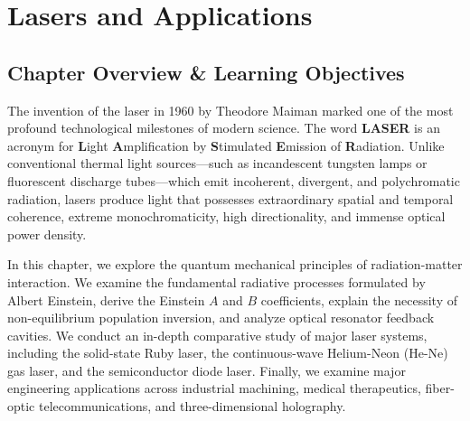 \chapter{Lasers and Applications}
\label{chap:lasers}

\section{Chapter Overview \& Learning Objectives}
The invention of the laser in 1960 by Theodore Maiman marked one of the most profound technological milestones of modern science. The word \textbf{LASER} is an acronym for \textbf{L}ight \textbf{A}mplification by \textbf{S}timulated \textbf{E}mission of \textbf{R}adiation. Unlike conventional thermal light sources—such as incandescent tungsten lamps or fluorescent discharge tubes—which emit incoherent, divergent, and polychromatic radiation, lasers produce light that possesses extraordinary spatial and temporal coherence, extreme monochromaticity, high directionality, and immense optical power density.

In this chapter, we explore the quantum mechanical principles of radiation-matter interaction. We examine the fundamental radiative processes formulated by Albert Einstein, derive the Einstein $A$ and $B$ coefficients, explain the necessity of non-equilibrium population inversion, and analyze optical resonator feedback cavities. We conduct an in-depth comparative study of major laser systems, including the solid-state Ruby laser, the continuous-wave Helium-Neon (He-Ne) gas laser, and the semiconductor diode laser. Finally, we examine major engineering applications across industrial machining, medical therapeutics, fiber-optic telecommunications, and three-dimensional holography.

